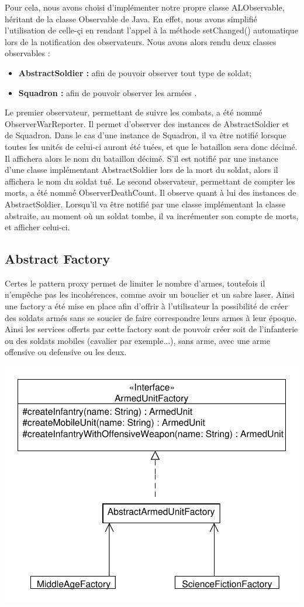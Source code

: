 \documentclass[12pt]{article}
\begin{document}
Pour cela, nous avons choisi d'implémenter notre propre classe ALObservable, héritant de la classe Observable de Java. En effet, nous avons simplifié l'utilisation de celle-çi en rendant l'appel à la méthode setChanged() automatique lors de la notification des observateurs.
Nous avons alors rendu deux classes observables :
\begin{itemize}
\item \textbf{AbstractSoldier :} afin de pouvoir observer tout type de soldat;
\item \textbf{Squadron :} afin de pouvoir observer les armées .
\end{itemize}

Le premier observateur, permettant de suivre les combats, a été nommé ObserverWarReporter. Il permet d'observer des instances de AbstractSoldier et de Squadron.
Dans le cas d'une instance de Squadron, il va être notifié lorsque toutes les unités de celui-ci auront été tuées, et que le bataillon sera donc décimé. Il affichera alors le nom du bataillon décimé. S'il est notifié par une instance d'une classe implémentant AbstractSoldier lors de la mort du soldat, alors il affichera le nom du soldat tué.
Le second observateur, permettant de compter les morts, a été nommé ObserverDeathCount. Il observe quant à lui des instances de AbstractSoldier. Lorsqu'il va être notifié par une classe implémentant la classe abstraite, au moment où un soldat tombe, il va incrémenter son compte de morts, et afficher celui-ci.

\subsection{Abstract Factory}
Certes le pattern proxy permet de limiter le nombre d'armes, toutefois il n'empêche
pas les incohérences, comme avoir un bouclier et un sabre laser.
Ainsi une factory a été mise en place afin d'offrir à l'utilisateur la possibilité
de créer des soldats armés sans se soucier de faire correspondre leurs armes à leur
époque. Ainsi les services offerts par cette factory sont de pouvoir créer
soit de l'infanterie ou des soldats mobiles (cavalier par exemple...),
sans arme, avec une arme offensive ou defensive ou les deux.

\includegraphics[scale=1]{../UML/AbstractFactory}
\end{document}
